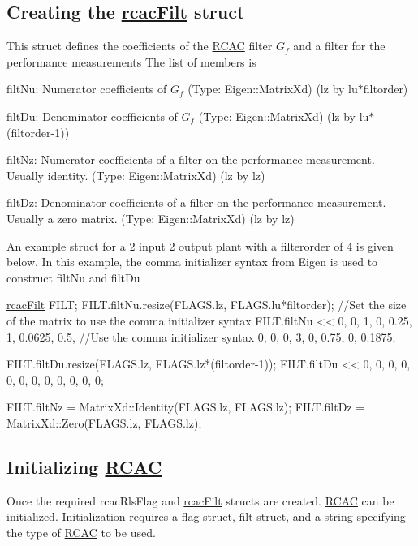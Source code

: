 \subsection*{Creating the \hyperlink{structrcac_filt}{rcac\+Filt} struct }

This struct defines the coefficients of the \hyperlink{class_r_c_a_c}{R\+C\+AC} filter $G_f$ and a filter for the performance measurements The list of members is
\begin{DoxyItemize}
\item filt\+Nu\+: Numerator coefficients of $G_f$ (Type\+: Eigen\+::\+Matrix\+Xd) (lz by lu$\ast$filtorder)
\item filt\+Du\+: Denominator coefficients of $G_f$ (Type\+: Eigen\+::\+Matrix\+Xd) (lz by lu$\ast$(filtorder-\/1))
\item filt\+Nz\+: Numerator coefficients of a filter on the performance measurement. Usually identity. (Type\+: Eigen\+::\+Matrix\+Xd) (lz by lz)
\item filt\+Dz\+: Denominator coefficients of a filter on the performance measurement. Usually a zero matrix. (Type\+: Eigen\+::\+Matrix\+Xd) (lz by lz)
\end{DoxyItemize}

An example struct for a 2 input 2 output plant with a filterorder of 4 is given below. In this example, the comma initializer syntax from Eigen is used to construct filt\+Nu and filt\+Du 
\begin{DoxyCode}
\hyperlink{structrcac_filt}{rcacFilt} FILT;
FILT.filtNu.resize(FLAGS.lz, FLAGS.lu*filtorder); \textcolor{comment}{//Set the size of the matrix to use the comma initializer
       syntax}
FILT.filtNu << 0, 0, 1, 0, 0.25, 1, 0.0625, 0.5, \textcolor{comment}{//Use the comma initializer syntax}
               0, 0, 0, 3, 0, 0.75, 0, 0.1875;

FILT.filtDu.resize(FLAGS.lz, FLAGS.lz*(filtorder-1));
FILT.filtDu << 0, 0, 0, 0, 0, 0,
               0, 0, 0, 0, 0, 0;

FILT.filtNz = MatrixXd::Identity(FLAGS.lz, FLAGS.lz);
FILT.filtDz =  MatrixXd::Zero(FLAGS.lz, FLAGS.lz);
\end{DoxyCode}


\subsection*{Initializing \hyperlink{class_r_c_a_c}{R\+C\+AC} }

Once the required rcac\+Rls\+Flag and \hyperlink{structrcac_filt}{rcac\+Filt} structs are created. \hyperlink{class_r_c_a_c}{R\+C\+AC} can be initialized. Initialization requires a flag struct, filt struct, and a string specifying the type of \hyperlink{class_r_c_a_c}{R\+C\+AC} to be used.


